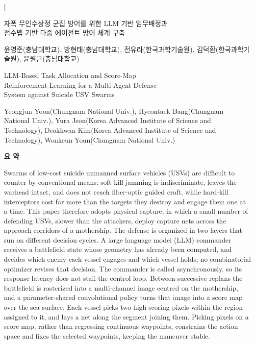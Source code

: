 \documentclass[10pt,twocolumn]{extarticle}
\newcommand{\KoreanTitle}[1]{{\centering\fontsize{20}{26}\selectfont #1\par}}
\newcommand{\KoreanAuthor}[1]{{\centering\fontsize{12}{18.7}\selectfont #1\par}}
\newcommand{\EnglishTitle}[1]{{\centering\fontsize{18}{23.4}\selectfont #1\par}}
\newcommand{\EnglishAuthor}[1]{{\centering\fontsize{12}{19.0}\selectfont #1\par}}
\newcommand{\AbstractHead}[1]{{\centering\bfseries\fontsize{13}{19.5}\selectfont #1\par}}
\newenvironment{snakabstract}
  {\par\AbstractLatin\fontsize{10}{13}\selectfont\setlength{\parindent}{7.1mm}}
  {\par}
\begin{document}
\twocolumn[
\begin{@twocolumnfalse}
\vspace*{7.06mm}

\KoreanTitle{자폭 무인수상정 군집 방어를 위한 LLM 기반 임무배정과\\
점수맵 기반 다중 에이전트 방어 체계 구축}

\KoreanAuthor{윤영준(충남대학교), 방현태(충남대학교), 전유라(한국과학기술원), 김덕환(한국과학기술원), 윤원근(충남대학교)}

\vspace{7.75mm}

\EnglishTitle{LLM-Based Task Allocation and Score-Map\\
Reinforcement Learning for a Multi-Agent Defense\\
System against Suicide USV Swarms}

\EnglishAuthor{Yeongjun Yoon(Chungnam National Univ.), Hyeontaek Bang(Chungnam National Univ.), Yura Jeon(Korea Advanced Institute of Science and Technology), Deokhwan Kim(Korea Advanced Institute of Science and Technology), Wonkeun Youn(Chungnam National Univ.)}

\vspace{9.2mm}

\AbstractHead{요 약}

\vspace{10.5mm}

\begin{snakabstract}
Swarms of low-cost suicide unmanned surface vehicles (USVs) are difficult to
counter by conventional means: soft-kill jamming is indiscriminate, leaves the
warhead intact, and does not reach fiber-optic guided craft, while hard-kill
interceptors cost far more than the targets they destroy and engage them one at
a time. This paper therefore adopts physical capture, in which a small number of
defending USVs, slower than the attackers, deploy capture nets across the
approach corridors of a mothership. The defense is organized in two layers that
run on different decision cycles. A large language model (LLM) commander
receives a battlefield state whose geometry has already been computed, and
decides which enemy each vessel engages and which vessel holds; no combinatorial
optimizer revises that decision. The commander is called asynchronously, so its
response latency does not stall the control loop. Between successive replans the
battlefield is rasterized into a multi-channel image centred on the mothership,
and a parameter-shared convolutional policy turns that image into a score map
over the sea surface. Each vessel picks two high-scoring pixels within the
region assigned to it, and lays a net along the segment joining them. Picking
pixels on a score map, rather than regressing continuous waypoints, constrains
the action space and fixes the selected waypoints, keeping the maneuver stable.
\end{snakabstract}


\end{@twocolumnfalse}
\end{document}
